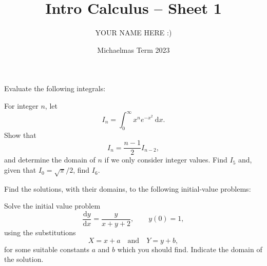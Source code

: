 \documentclass[answers]{exam}
\title{Intro Calculus -- Sheet 1}
\author{YOUR NAME HERE :)}
\date{Michaelmas Term 2023}
\newcommand*{\bump}{\vspace{1em}\phantom{}\vspace{-1.75em}}
\begin{document}
\maketitle
\begin{questions}

\question%
Evaluate the following integrals:



\question%
For integer $n$, let \[
	I_n=\int_0^\infty x^ne^{-x^2}\mathrm{~d}x.
\] Show that \[
	I_n=\frac{n-1}2I_{n-2},
\] and determine the domain of $n$ if we only consider integer values. Find $I_5$ and, given that $I_0=\sqrt\pi/2$, find $I_6$.



\question%
Find the solutions, with their domains, to the following initial-value problems:
\begin{parts}
\part%
\bump \[
	\frac{\mathrm dy}{\mathrm dx}=\frac{2xy^2+x}{x^2y+y},\qquad
	y(\sqrt2)=1,
\]

\part%
\bump \[
	\sin x\sin y\frac{\mathrm dy}{\mathrm dx}=\cos x\cos y,\qquad
	y\left(\frac\pi2\right)=\frac\pi4.
\]
\end{parts}



\question%
Solve the initial value problem \[
	\frac{\mathrm dy}{\mathrm dx}=\frac{y}{x+y+2},\qquad
	y(0)=1,
\] using the substitutions \[
	X=x+a\quad\text{and}\quad Y=y+b,
\] for some suitable constants $a$ and $b$ which you should find. Indicate the domain of the solution.




\end{questions}
\end{document}
